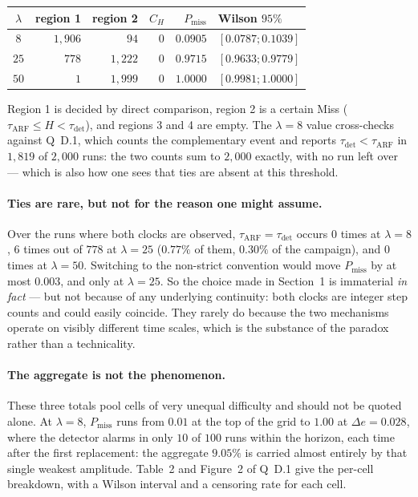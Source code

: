 \documentclass[11pt,a4paper]{article}
\begin{document}
\begin{center}
\begin{tabular}{crrrrl}
\toprule
$\lambda$ & region 1 & region 2 & $C_H$ & $P_{\mathrm{miss}}$ & Wilson $95\%$ \\
\midrule
$8$  & $1{,}906$ & $94$    & $0$ & $0.0905$ & $[0.0787;0.1039]$ \\
$25$ & $778$     & $1{,}222$ & $0$ & $0.9715$ & $[0.9633;0.9779]$ \\
$50$ & $1$       & $1{,}999$ & $0$ & $1.0000$ & $[0.9981;1.0000]$ \\
\bottomrule
\end{tabular}
\end{center}

\noindent Region 1 is decided by direct comparison, region 2 is a certain Miss
($\tau_{\mathrm{ARF}}\le H<\tau_{\mathrm{det}}$), and regions 3 and 4 are empty. The
$\lambda=8$ value cross-checks against Q~D.1, which counts the complementary event and
reports $\tau_{\mathrm{det}}<\tau_{\mathrm{ARF}}$ in $1{,}819$ of $2{,}000$ runs: the
two counts sum to $2{,}000$ exactly, with no run left over --- which is also how one
sees that ties are absent at this threshold.

\paragraph{Ties are rare, but not for the reason one might assume.} Over the runs where
both clocks are observed, $\tau_{\mathrm{ARF}}=\tau_{\mathrm{det}}$ occurs $0$ times at
$\lambda=8$, $6$ times out of $778$ at $\lambda=25$ ($0.77\%$ of them, $0.30\%$ of the
campaign), and $0$ times at $\lambda=50$. Switching to the non-strict convention would
move $P_{\mathrm{miss}}$ by at most $0.003$, and only at $\lambda=25$. So the choice made
in Section~1 is immaterial \emph{in fact} --- but not because of any underlying
continuity: both clocks are integer step counts and could easily coincide. They rarely
do because the two mechanisms operate on visibly different time scales, which is the
substance of the paradox rather than a technicality.

\paragraph{The aggregate is not the phenomenon.} These three totals pool cells of very
unequal difficulty and should not be quoted alone. At $\lambda=8$, $P_{\mathrm{miss}}$
runs from $0.01$ at the top of the grid to $1.00$ at $\Delta e=0.028$, where the
detector alarms in only $10$ of $100$ runs within the horizon, each time after the first
replacement: the aggregate $9.05\%$ is carried
almost entirely by that single weakest amplitude. Table~2 and Figure~2 of Q~D.1 give the
per-cell breakdown, with a Wilson interval and a censoring rate for each cell.
\end{document}
